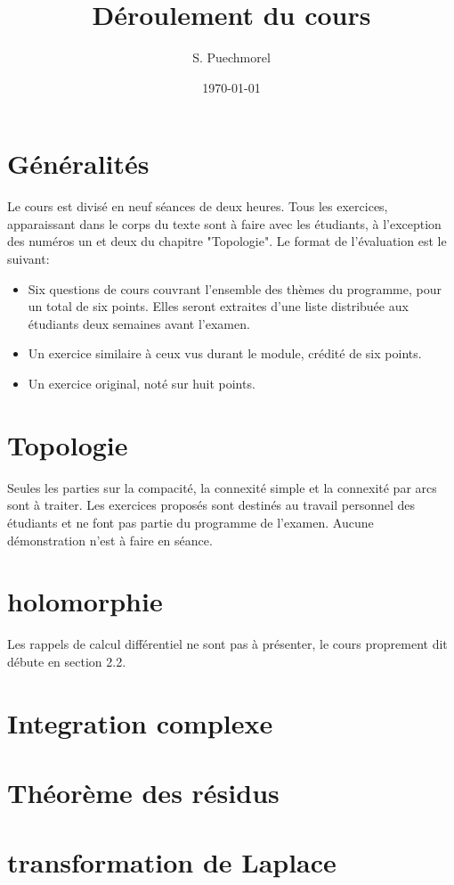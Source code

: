 \documentclass[a4paper]{amsart}
\author{S. Puechmorel}
\date{\today}
\title{Déroulement du cours}
\begin{document}
\section{Généralités}
Le cours est divisé en neuf séances de deux heures. Tous les exercices, apparaissant dans le corps du texte sont à faire avec les
étudiants, à l'exception des numéros un et deux du chapitre "Topologie". Le format de l'évaluation est le suivant:
\begin{itemize}
    \item Six questions de cours couvrant l'ensemble des thèmes du programme, pour un total de six points. Elles seront extraites d'une liste
    distribuée aux étudiants deux semaines avant l'examen.
    \item Un exercice similaire à ceux vus durant le module, crédité de six points. 
    \item Un exercice original, noté sur huit points.    
\end{itemize}
\section{Topologie}
Seules les parties sur la compacité, la connexité simple et la connexité par arcs sont à traiter. Les exercices proposés sont destinés
au travail personnel des étudiants et ne font pas partie du programme de l'examen. Aucune démonstration n'est à faire en séance.
\section{holomorphie}
Les rappels de calcul différentiel ne sont pas à présenter, le cours proprement dit débute en section 2.2. 
\section{Integration complexe}
\section{Théorème des résidus}
\section{transformation de Laplace}
\end{document}
